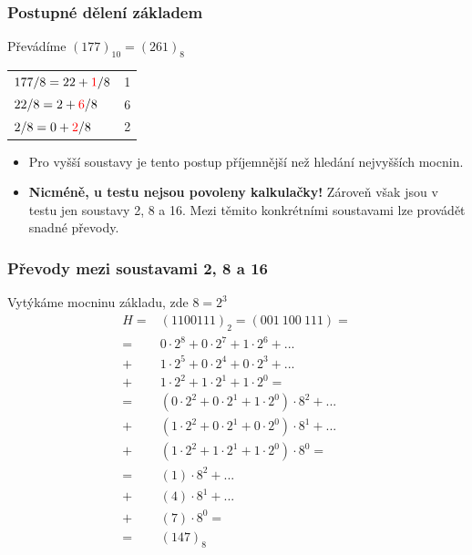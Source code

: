   \begin{frame}
    \frametitle{Postupné dělení základem}
    \boldmath
    Převádíme $(177)_{10}=(261)_{8}$

		\begin{center}
      \begin{tabular}{p{60mm} | p{15mm}}
        $177 / 8 = 22 + \textcolor{red}{1}/8$ & 1 \\
        $22 / 8 = 2 + \textcolor{red}{6}/8$ & 6 \\
        $2 / 8 = 0 + \textcolor{red}{2}/8$ & 2 \\
      \end{tabular}
    \end{center}
    
    \begin{itemize}
      \item Pro vyšší soustavy je tento postup příjemnější než hledání nejvyšších mocnin.
      \item \textbf{Nicméně, u testu nejsou povoleny kalkulačky!} Zároveň však jsou v testu jen soustavy 2, 8 a 16. Mezi těmito konkrétními soustavami lze provádět snadné převody.
    \end{itemize}
	\end{frame}
	
	\begin{frame}
    \frametitle{Převody mezi soustavami 2, 8 a 16}
		\boldmath
		Vytýkáme mocninu základu, zde $8 = 2^{3}$
      \small
			\begin{align*}
			H =& (1100111)_2 = (001\:100\:111) = \\[2pt]
			  =& 0 \cdot 2^{8} + 0 \cdot 2^{7} + 1 \cdot 2^{6} + ...\\ 
				+& 1 \cdot 2^{5} + 0 \cdot 2^{4} + 0 \cdot 2^{3} + ...\\
				+& 1 \cdot 2^{2} + 1 \cdot 2^{1} + 1 \cdot 2^{0} = \\[2pt]
				=& (0 \cdot 2^{2} + 0 \cdot 2^{1} + 1 \cdot 2^{0}) \cdot 8^{2} + ...\\ 
				+& (1 \cdot 2^{2} + 0 \cdot 2^{1} + 0 \cdot 2^{0}) \cdot 8^{1} + ...\\
				+& (1 \cdot 2^{2} + 1\cdot 2^{1} + 1 \cdot 2^{0}) \cdot 8^{0} = \\[2pt]
				=& (1) \cdot 8^{2} + ...\\ 
				+& (4) \cdot 8^{1} + ...\\
				+& (7) \cdot 8^{0} = \\[2pt]
				=& (147)_8
			\end{align*}
		
	\end{frame}
	
